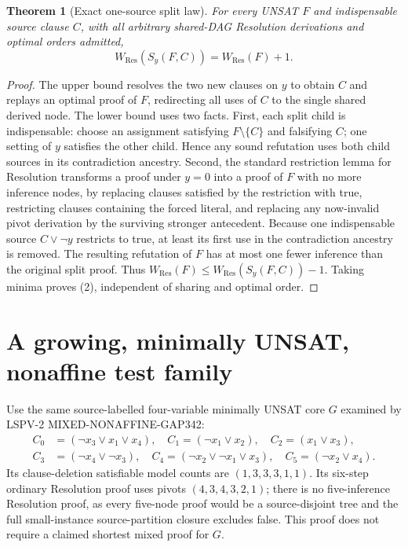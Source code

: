 \documentclass[11pt]{article}
\newtheorem{theorem}{Theorem}
\begin{document}
\begin{theorem}[Exact one-source split law]
For every UNSAT $F$ and indispensable source clause $C$, with all arbitrary shared-DAG Resolution derivations and optimal orders admitted,
\[
W_{\mathrm{Res}}(S_y(F,C))=W_{\mathrm{Res}}(F)+1.
\tag{2}
\]
\end{theorem}
\begin{proof}
The upper bound resolves the two new clauses on $y$ to obtain $C$ and replays an optimal proof of $F$, redirecting all uses of $C$ to the single shared derived node. The lower bound uses two facts. First, each split child is indispensable: choose an assignment satisfying $F\setminus\{C\}$ and falsifying $C$; one setting of $y$ satisfies the other child. Hence any sound refutation uses both child sources in its contradiction ancestry. Second, the standard restriction lemma for Resolution transforms a proof under $y=0$ into a proof of $F$ with no more inference nodes, by replacing clauses satisfied by the restriction with true, restricting clauses containing the forced literal, and replacing any now-invalid pivot derivation by the surviving stronger antecedent. Because one indispensable source $C\lor\neg y$ restricts to true, at least its first use in the contradiction ancestry is removed. The resulting refutation of $F$ has at most one fewer inference than the original split proof. Thus $W_{\mathrm{Res}}(F)\le W_{\mathrm{Res}}(S_y(F,C))-1$. Taking minima proves (2), independent of sharing and optimal order.
\end{proof}

\section*{A growing, minimally UNSAT, nonaffine test family}
Use the same source-labelled four-variable minimally UNSAT core $G$ examined by LSPV-2 MIXED-NONAFFINE-GAP342:
\[
\begin{split}
C_0&=(\neg x_3\vee x_1\vee x_4),\quad
C_1=(\neg x_1\vee x_2),\quad C_2=(x_1\vee x_3),\\
C_3&=(\neg x_4\vee\neg x_3),\quad
C_4=(\neg x_2\vee\neg x_1\vee x_3),\quad
C_5=(\neg x_2\vee x_4).
\end{split}
\tag{3}
\]
Its clause-deletion satisfiable model counts are $(1,3,3,3,1,1)$. Its six-step ordinary Resolution proof uses pivots $(4,3,4,3,2,1)$; there is no five-inference Resolution proof, as every five-node proof would be a source-disjoint tree and the full small-instance source-partition closure excludes false. This proof does not require a claimed shortest mixed proof for $G$.
\end{document}
